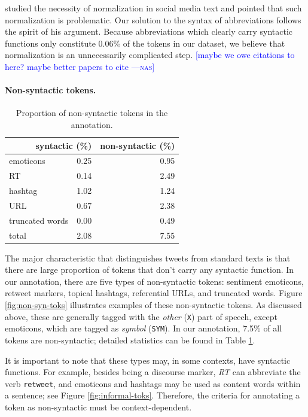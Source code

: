\documentclass[11pt,a4paper]{article}
\newcommand{\yjcomment}[1]{\textcolor{orange}{[$_\mathrm{L}^\mathrm{Y}$#1]}}
\newcommand{\nascomment}[1]{\textcolor{blue}{[#1 ---\textsc{nas}]}}
\begin{document}
\citet{eisenstein:2013:NAACL-HLT} studied the necessity of normalization
in social media text and pointed that such normalization is problematic.
Our solution to the syntax of abbreviations follows the spirit of his argument. Because abbreviations which clearly carry
syntactic functions only constitute 0.06\% of the tokens in our
dataset, we believe that normalization is an unnecessarily complicated step.
\nascomment{maybe we owe citations to
  \cite{finin-EtAl:2010:MTURK,eisenstein:2013:NAACL-HLT} here?  maybe
  better papers to cite}


\paragraph{Non-syntactic tokens.}  
\begin{table}
\centering
\begin{tabular}{lrr}
\multicolumn{2}{r}{syntactic (\%)} & non-syntactic (\%)\\ \hline
emoticons & 0.25 & 0.95 \\
RT & 0.14 & 2.49\\
hashtag & 1.02 & 1.24 \\
URL & 0.67 & 2.38 \\
truncated words & 0.00 & 0.49 \\
 \hline
 total & 2.08 & 7.55 \\
\end{tabular}
\caption{Proportion of non-syntactic tokens in the annotation.}\label{tbl:non-synt-prop}
\end{table}
The major characteristic that distinguishes tweets from standard texts is that
there are large proportion of tokens that don't carry any syntactic function.
In our annotation, there are five types of non-syntactic tokens: 
sentiment emoticons, retweet markers, topical hashtags, referential URLs, and
truncated words. Figure \ref{fig:non-syn-toks} illustrates examples of
these non-syntactic tokens.  As discussed above, these are generally
tagged with the \emph{other} (\texttt{X}) part of speech, except
emoticons, which are tagged as \emph{symbol} (\texttt{SYM}).  In our annotation, 
7.5\% of all tokens are non-syntactic; detailed statistics can be found in Table \ref{tbl:non-synt-prop}.

It is important to note that these types may, in some
contexts, have syntactic functions.
For example, besides being a discourse marker, \emph{RT} can
abbreviate the verb {\tt retweet}, and emoticons and hashtags may be
used as content words within a sentence; see  Figure
\ref{fig:informal-toks}.  Therefore, the criteria for annotating a
token as non-syntactic must be context-dependent.
\end{document}
